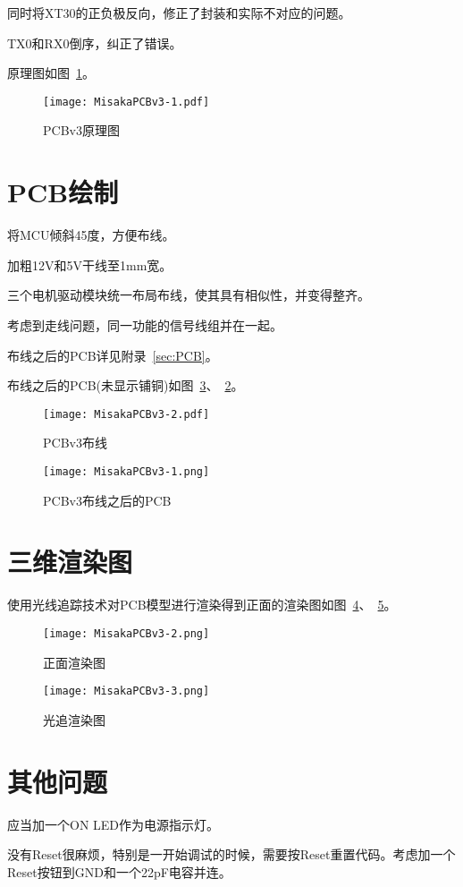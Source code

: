 同时将XT30的正负极反向，修正了封装和实际不对应的问题。

TX0和RX0倒序，纠正了错误。

原理图如图~\ref{fig:MisakaPCBv3-sch}。

\begin{figure}[htbp]
    \centering
    \texttt{[image: MisakaPCBv3-1.pdf]}
    \caption{PCBv3原理图}
    \label{fig:MisakaPCBv3-sch}
\end{figure}

\section{PCB绘制}

将MCU倾斜45度，方便布线。

加粗12V和5V干线至1mm宽。

三个电机驱动模块统一布局布线，使其具有相似性，并变得整齐。

考虑到走线问题，同一功能的信号线组并在一起。

布线之后的PCB详见附录~\ref{sec:PCB}。

布线之后的PCB(未显示铺铜)如图~\ref{fig:MisakaPCBv3-1}、~\ref{fig:MisakaPCBv3}。

\begin{figure}[htbp]
    \centering
    \texttt{[image: MisakaPCBv3-2.pdf]}
    \caption{PCBv3布线}
    \label{fig:MisakaPCBv3}
\end{figure}

\begin{figure}[htbp]
    \centering
    \texttt{[image: MisakaPCBv3-1.png]}
    \caption{PCBv3布线之后的PCB}
    \label{fig:MisakaPCBv3-1}
\end{figure}

\section{三维渲染图}

使用光线追踪技术对PCB模型进行渲染得到正面的渲染图如图~\ref{fig:MisakaPCBv3-2}、~\ref{fig:MisakaPCBv3-3}。

\begin{figure}[htbp]
    \centering
    \texttt{[image: MisakaPCBv3-2.png]}
    \caption{正面渲染图}
    \label{fig:MisakaPCBv3-2}
\end{figure}

\begin{figure}[htbp]
    \centering
    \texttt{[image: MisakaPCBv3-3.png]}
    \caption{光追渲染图}
    \label{fig:MisakaPCBv3-3}
\end{figure}

\section{其他问题}

应当加一个ON LED作为电源指示灯。

没有Reset很麻烦，特别是一开始调试的时候，需要按Reset重置代码。考虑加一个Reset按钮到GND和一个22pF电容并连。
